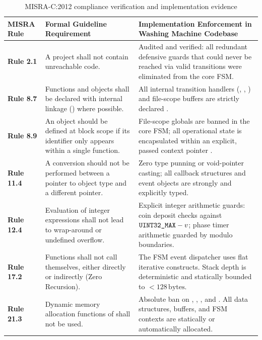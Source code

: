 \begin{table}[H]
  \centering
  \caption{MISRA-C:2012 compliance verification and implementation evidence}
  \label{tab:misra}
  \small
  \renewcommand{\arraystretch}{1.18}
  \begin{tabularx}{\linewidth}{L{2.2cm}L{4.4cm}Y}
    \toprule
    \textbf{MISRA Rule} & \textbf{Formal Guideline Requirement} & \textbf{Implementation Enforcement in Washing Machine Codebase} \\
    \midrule
    \textbf{Rule 2.1} & A project shall not contain unreachable code. & Audited and verified: all redundant defensive guards that could never be reached via valid transitions were eliminated from the core FSM. \\
    \textbf{Rule 8.7} & Functions and objects shall be declared with internal linkage () where possible. & All internal transition handlers (, , ) and file-scope buffers are strictly declared . \\
    \textbf{Rule 8.9} & An object should be defined at block scope if its identifier only appears within a single function. & File-scope globals are banned in the core FSM; all operational state is encapsulated within an explicit, passed context pointer . \\
    \textbf{Rule 11.4} & A conversion should not be performed between a pointer to object type and a different pointer. & Zero type punning or void-pointer casting; all callback structures and event objects are strongly and explicitly typed. \\
    \textbf{Rule 12.4} & Evaluation of integer expressions shall not lead to wrap-around or undefined overflow. & Explicit integer arithmetic guards: coin deposit checks against $\code{UINT32_MAX} - v$; phase timer arithmetic guarded by modulo boundaries. \\
    \textbf{Rule 17.2} & Functions shall not call themselves, either directly or indirectly (Zero Recursion). & The FSM event dispatcher uses flat iterative  constructs. Stack depth is deterministic and statically bounded to $<128\,\text{bytes}$. \\
    \textbf{Rule 21.3} & Dynamic memory allocation functions of  shall not be used. & Absolute ban on , , , and . All data structures, buffers, and FSM contexts are statically or automatically allocated. \\
    \bottomrule
  \end{tabularx}
\end{table}

